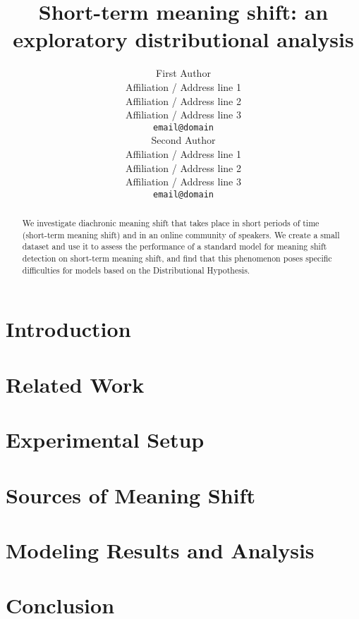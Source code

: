 \documentclass[11pt,a4paper]{article}
\title{Short-term meaning shift: an exploratory distributional analysis}
\author{First Author \\
  Affiliation / Address line 1 \\
  Affiliation / Address line 2 \\
  Affiliation / Address line 3 \\
  {\tt email@domain} \\\And
  Second Author \\
  Affiliation / Address line 1 \\
  Affiliation / Address line 2 \\
  Affiliation / Address line 3 \\
  {\tt email@domain} \\}
\date{}
\begin{document}
\maketitle
\begin{abstract}
We investigate diachronic meaning shift that takes place in short periods of time (short-term meaning shift) and in an online community of speakers. We create a small dataset and use it to assess the performance of a standard model for meaning shift detection on short-term meaning shift, and find that this phenomenon poses specific difficulties for models based on the Distributional Hypothesis. 
\end{abstract}

\section{Introduction}
\label{sect:Introduction}


 
\section{Related Work}
\label{sect:Related_Work}



\section{Experimental Setup}
\label{sec:setup}



\section{Sources of Meaning Shift}
\label{sec:sources}



\section{Modeling Results and Analysis}
\label{sect:results}



\section{Conclusion}
\label{sect:conc}






%
%
\end{document}
